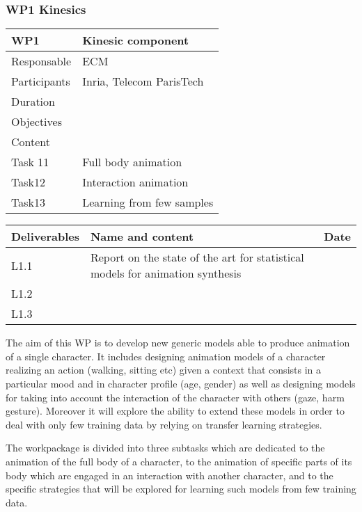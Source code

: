 

\subsubsection{WP1 Kinesics}


\begin{center}
\begin{tabular}{|l|l|}\hline
WP1 &  Kinesic component \\\hline
Responsable &  ECM  \\\hline
Participants &  Inria, Telecom ParisTech\\\hline
Duration  &   \\\hline
Objectives &   \\\hline
Content &  \\\hline
Task 11 & Full body animation  \\\hline
Task12 &  Interaction animation \\\hline
Task13 &  Learning from few samples  \\\hline
\end{tabular}
\begin{tabular}{|l|l|l|}\hline
Deliverables & Name and content  & Date  \\\hline
L1.1  & Report on the state of the art for statistical models for animation synthesis & \\\hline
L1.2  &  & \\\hline
L1.3  &  & \\\hline
\end{tabular}
\end{center}



The aim of this WP is to develop new generic models able to produce animation of a single character. It includes designing animation models of a character realizing an action (walking, sitting etc) given a context that consists in a particular mood and in character profile (age, gender) as well as designing models for taking into account the interaction of the character with others (gaze, harm gesture). Moreover it will explore the ability to extend these models in order to deal with only few training data by relying on transfer learning strategies.

The workpackage is divided into three subtasks which are dedicated to the animation of the full body of a character, to the animation of specific parts of its body which are engaged in an interaction with another character, and to the specific strategies that will be explored for learning such models from few training data.

